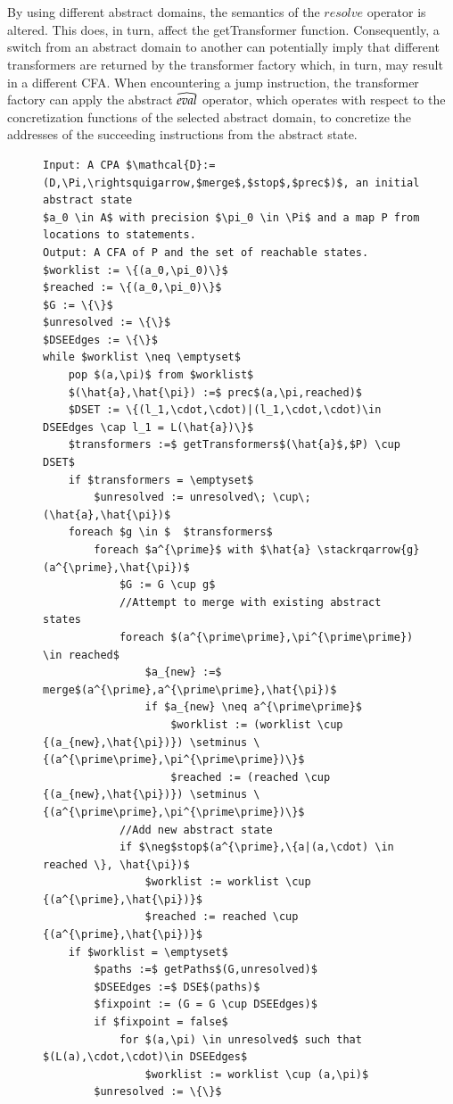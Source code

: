 \documentclass{kththesis}
\newcommand\stackrqarrow[1]{%
    \mathrel{\stackon[2pt]{$\rightsquigarrow$}{$\scriptscriptstyle#1$}}}
\newcommand{\bighat}[1]{\widehat{\textrm{\emph{\rule{0ex}{1.2ex}\smash{#1}}}}}
\begin{document}
\\ \\
By using different abstract domains, the semantics of the $resolve$ operator is altered. This does, in turn, affect the getTransformer function. Consequently, a switch from an abstract domain to another can potentially imply that different transformers are returned by the transformer factory which, in turn, may result in a different CFA. When encountering a jump instruction, the transformer factory can apply the abstract $\bighat{eval}$ operator, which operates with respect to the concretization functions of the selected abstract domain, to concretize the addresses of the succeeding instructions from the abstract state.
\begin{figure}[htb]
    \centering
\begin{algorithmFrame}
\begin{lstlisting}[style=algorithm]
Input: A CPA $\mathcal{D}:=(D,\Pi,\rightsquigarrow,$merge$,$stop$,$prec$)$, an initial abstract state
$a_0 \in A$ with precision $\pi_0 \in \Pi$ and a map P from locations to statements.
Output: A CFA of P and the set of reachable states.
$worklist := \{(a_0,\pi_0)\}$
$reached := \{(a_0,\pi_0)\}$
$G := \{\}$
$unresolved := \{\}$
$DSEEdges := \{\}$
while $worklist \neq \emptyset$ 
    pop $(a,\pi)$ from $worklist$
    $(\hat{a},\hat{\pi}) :=$ prec$(a,\pi,reached)$
    $DSET := \{(l_1,\cdot,\cdot)|(l_1,\cdot,\cdot)\in DSEEdges \cap l_1 = L(\hat{a})\}$
    $transformers :=$ getTransformers$(\hat{a}$,$P) \cup DSET$
    if $transformers = \emptyset$
        $unresolved := unresolved\; \cup\; (\hat{a},\hat{\pi})$
    foreach $g \in $  $transformers$ 
        foreach $a^{\prime}$ with $\hat{a} \stackrqarrow{g} (a^{\prime},\hat{\pi})$
            $G := G \cup g$
            //Attempt to merge with existing abstract states
            foreach $(a^{\prime\prime},\pi^{\prime\prime}) \in reached$
                $a_{new} :=$ merge$(a^{\prime},a^{\prime\prime},\hat{\pi})$
                if $a_{new} \neq a^{\prime\prime}$
                    $worklist := (worklist \cup {(a_{new},\hat{\pi})}) \setminus \{(a^{\prime\prime},\pi^{\prime\prime})\}$
                    $reached := (reached \cup {(a_{new},\hat{\pi})}) \setminus \{(a^{\prime\prime},\pi^{\prime\prime})\}$
            //Add new abstract state
            if $\neg$stop$(a^{\prime},\{a|(a,\cdot) \in reached \}, \hat{\pi})$
                $worklist := worklist \cup {(a^{\prime},\hat{\pi})}$
                $reached := reached \cup {(a^{\prime},\hat{\pi})}$
    if $worklist = \emptyset$
        $paths :=$ getPaths$(G,unresolved)$
        $DSEEdges :=$ DSE$(paths)$
        $fixpoint := (G = G \cup DSEEdges)$
        if $fixpoint = false$
            for $(a,\pi) \in unresolved$ such that $(L(a),\cdot,\cdot)\in DSEEdges$
                $worklist := worklist \cup (a,\pi)$
        $unresolved := \{\}$
            

\end{lstlisting}
\end{algorithmFrame}
\end{figure}
\end{document}

